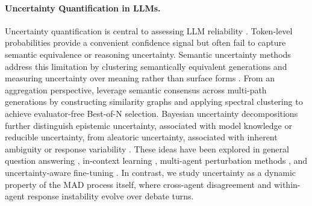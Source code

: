\documentclass{article}
\theoremstyle{plain}
\theoremstyle{definition}
\theoremstyle{remark}
\begin{document}
\paragraph{Uncertainty Quantification in LLMs.}
Uncertainty quantification is central to assessing LLM reliability \cite{huang2025look}. Token-level probabilities provide a convenient confidence signal but often fail to capture semantic equivalence or reasoning uncertainty. Semantic uncertainty methods address this limitation by clustering semantically equivalent generations and measuring uncertainty over meaning rather than surface forms \cite{kuhnsemantic, wang2025measuring}. From an aggregation perspective, \citet{choi2026modex} leverage semantic consensus across multi-path generations by constructing similarity graphs and applying spectral clustering to achieve evaluator-free Best-of-N selection. Bayesian uncertainty decompositions further distinguish epistemic uncertainty, associated with model knowledge or reducible uncertainty, from aleatoric uncertainty, associated with inherent ambiguity or response variability \cite{liu2025uncertainty, huang2024survey, geng2024confidencesurvey}. These ideas have been explored in general question answering \cite{abbasi2024believe}, in-context learning \cite{jayasekera2025variational, ling2024uncertainty}, multi-agent perturbation methods \cite{amayuelas2024knowledge}, and uncertainty-aware fine-tuning \cite{feng2025rethinking}. In contrast, we study uncertainty as a dynamic property of the MAD process itself, where cross-agent disagreement and within-agent response instability evolve over debate turns.
\end{document}
